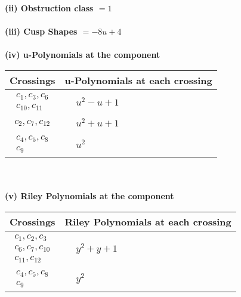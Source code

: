 \documentclass[1p]{elsarticle_modified}
\theoremstyle{definition}
\begin{document}
\flushleft \textbf{(ii) Obstruction class $= 1$}\\~\\
\flushleft \textbf{(iii) Cusp Shapes $= -8 u+4$}\\~\\
\newpage\renewcommand{\arraystretch}{1}
\flushleft \textbf{(iv) u-Polynomials at the component}\newline \\
\begin{tabular}{m{50pt}|m{274pt}}
Crossings & \hspace{64pt}u-Polynomials at each crossing \\
\hline $$\begin{aligned}c_{1},c_{3},c_{6}\\c_{10},c_{11}\end{aligned}$$&$\begin{aligned}
&u^2- u+1
\end{aligned}$\\
\hline $$\begin{aligned}c_{2},c_{7},c_{12}\end{aligned}$$&$\begin{aligned}
&u^2+u+1
\end{aligned}$\\
\hline $$\begin{aligned}c_{4},c_{5},c_{8}\\c_{9}\end{aligned}$$&$\begin{aligned}
&u^2
\end{aligned}$\\
\hline
\end{tabular}\\~\\
\newpage\renewcommand{\arraystretch}{1}
\flushleft \textbf{(v) Riley Polynomials at the component}\newline \\
\begin{tabular}{m{50pt}|m{274pt}}
Crossings & \hspace{64pt}Riley Polynomials at each crossing \\
\hline $$\begin{aligned}c_{1},c_{2},c_{3}\\c_{6},c_{7},c_{10}\\c_{11},c_{12}\end{aligned}$$&$\begin{aligned}
&y^2+y+1
\end{aligned}$\\
\hline $$\begin{aligned}c_{4},c_{5},c_{8}\\c_{9}\end{aligned}$$&$\begin{aligned}
&y^2
\end{aligned}$\\
\hline
\end{tabular}\\~\\
\end{document}
